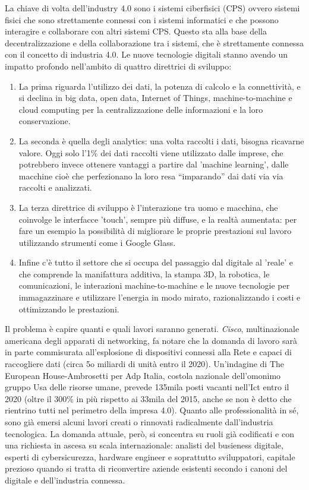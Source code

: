 \documentclass[12pt, a4paper, oneside]{book}
\begin{document}
La chiave di volta dell'industry 4.0 sono i sistemi ciberfisici (CPS) ovvero sistemi fisici che sono strettamente connessi con i sistemi informatici e che possono interagire e collaborare con altri sistemi CPS. Questo sta alla base della decentralizzazione e della collaborazione tra i sistemi, che è strettamente connessa con il concetto di industria 4.0.
Le nuove tecnologie digitali stanno avendo un impatto profondo nell’ambito di quattro direttrici di sviluppo: 
\begin{enumerate}
	\item La prima riguarda l'utilizzo dei dati, la potenza di calcolo e la connettività, e si declina in big data, open data, Internet of Things, machine-to-machine e cloud computing per la centralizzazione delle informazioni e la loro conservazione.
	\item La seconda è quella degli analytics: una volta raccolti i dati, bisogna ricavarne valore. Oggi solo l'1\% dei dati raccolti viene utilizzato dalle imprese, che potrebbero invece ottenere vantaggi a partire dal 'machine learning', dalle macchine cioè che perfezionano la loro resa “imparando” dai dati via via raccolti e analizzati.
	\item La terza direttrice di sviluppo è l’interazione tra uomo e macchina, che coinvolge le interfacce 'touch', sempre più diffuse, e la realtà aumentata:  per fare un esempio la possibilità di migliorare le proprie prestazioni sul lavoro utilizzando strumenti come i Google Glass.
	\item Infine c'è tutto il settore che si occupa del passaggio dal digitale al 'reale' e che comprende la manifattura additiva, la stampa 3D, la robotica, le comunicazioni, le interazioni machine-to-machine e le nuove tecnologie per immagazzinare e utilizzare l'energia in modo mirato, razionalizzando i costi e ottimizzando le prestazioni.
\end{enumerate} 
Il problema è capire quanti e quali lavori saranno generati. \textit{Cisco}, multinazionale americana degli apparati di networking, fa notare che la domanda di lavoro sarà in parte commisurata all'esplosione di dispositivi connessi alla Rete e capaci di raccogliere dati (circa 5o miliardi di unità entro il 2020). Un'indagine di The European House-Ambrosetti per Adp Italia, costola nazionale dell'omonimo gruppo Usa delle risorse umane, prevede 135mila posti vacanti nell'Ict entro il 2020 (oltre il 300\% in più rispetto ai 33mila del 2015, anche se non è detto che rientrino tutti nel perimetro della impresa 4.0). Quanto alle professionalità in sé, sono già emersi alcuni lavori creati o rinnovati radicalmente dall'industria tecnologica. La domanda attuale, però, si concentra su ruoli già codificati e con una richiesta in ascesa su scala internazionale: analisti del busieness digitale, esperti di cybersicurezza, hardware engineer e soprattutto sviluppatori, capitale prezioso quando si tratta di riconvertire aziende esistenti secondo i canoni del digitale e dell'industria connessa.
\end{document}
